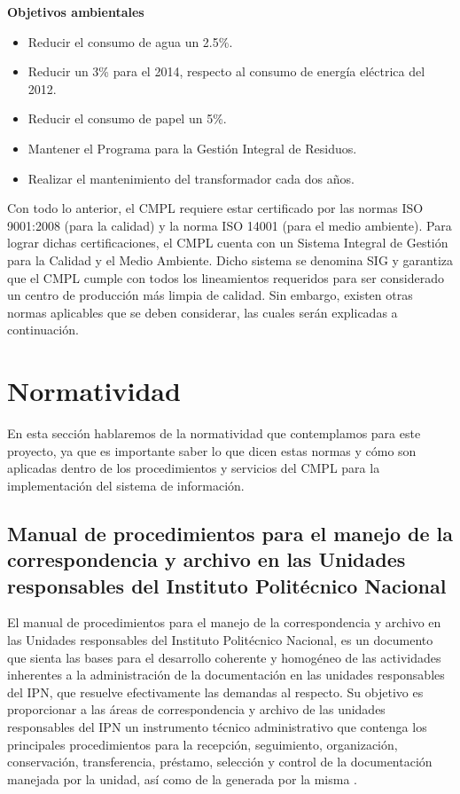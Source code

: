 \textbf{Objetivos ambientales}

\begin{itemize}
	\item Reducir el consumo de agua un 2.5\%.
	\item Reducir un 3\% para el 2014, respecto al consumo de energía eléctrica del 2012.
	\item Reducir el consumo de papel un 5\%.
	\item Mantener el Programa para la Gestión Integral de Residuos.
	\item Realizar el mantenimiento del transformador cada dos años.
\end{itemize}

	Con todo lo anterior, el CMPL requiere estar certificado por las normas ISO 9001:2008 (para la calidad) y la norma ISO 14001 (para el medio ambiente). Para lograr dichas certificaciones, el CMPL cuenta con un Sistema Integral de Gestión para la Calidad y el Medio Ambiente. Dicho sistema se denomina SIG y garantiza que el CMPL cumple con todos los lineamientos requeridos para ser considerado un centro de producción más limpia de calidad. Sin embargo, existen otras normas aplicables que se deben considerar, las cuales serán explicadas a continuación.
	
\section{Normatividad}
	En esta sección hablaremos de la normatividad que contemplamos para este proyecto, ya que es importante saber lo que dicen estas normas y cómo son aplicadas dentro de los procedimientos y servicios del CMPL para la implementación del sistema de información.\\
	
	\subsection{Manual de procedimientos para el manejo de la correspondencia y archivo en las Unidades responsables del Instituto Politécnico Nacional}
	
	El manual de procedimientos para el manejo de la correspondencia y archivo en las Unidades responsables del Instituto Politécnico Nacional, es un documento que sienta las bases para el desarrollo coherente y homogéneo de las actividades inherentes a la administración de la documentación en las unidades responsables del IPN, que resuelve efectivamente las demandas al respecto. Su objetivo es proporcionar a las áreas de correspondencia y archivo de las unidades responsables del IPN un instrumento técnico administrativo que contenga los principales procedimientos para la recepción, seguimiento, organización, conservación,
transferencia, préstamo, selección y control de la documentación manejada por la unidad, así como de la generada por la misma \cite{ManProcyArcIPN}.\\
	
